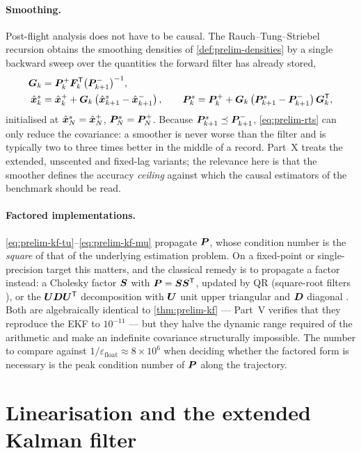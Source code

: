 \paragraph{Smoothing.} Post-flight analysis does not have to be causal. The
Rauch--Tung--Striebel recursion \cite{rauch1965rts} obtains the smoothing densities of
\cref{def:prelim-densities} by a single backward sweep over the quantities the forward filter has
already stored,
\begin{align}
\bm{G}_k &= \bm{P}^{+}_k\bm{F}_k^{\mathsf{T}}\big(\bm{P}^{-}_{k+1}\big)^{-1}, \label{eq:prelim-rtsgain}\\
\hat{\bm{x}}^{s}_k &= \hat{\bm{x}}^{+}_k + \bm{G}_k\left(\hat{\bm{x}}^{s}_{k+1} - \hat{\bm{x}}^{-}_{k+1}\right), \qquad
\bm{P}^{s}_k = \bm{P}^{+}_k + \bm{G}_k\left(\bm{P}^{s}_{k+1} - \bm{P}^{-}_{k+1}\right)\bm{G}_k^{\mathsf{T}},
\label{eq:prelim-rts}
\end{align}
initialised at $\hat{\bm{x}}^s_N = \hat{\bm{x}}^{+}_N$, $\bm{P}^s_N = \bm{P}^{+}_N$. Because
$\bm{P}^{s}_{k+1}\preceq\bm{P}^{-}_{k+1}$, \eqref{eq:prelim-rts} can only reduce the covariance: a
smoother is never worse than the filter and is typically two to three times better in the middle
of a record. Part~X treats the extended, unscented and fixed-lag variants; the relevance here is
that the smoother defines the accuracy \emph{ceiling} against which the causal estimators of the
benchmark should be read.

\paragraph{Factored implementations.} \eqref{eq:prelim-kf-tu}--\eqref{eq:prelim-kf-mu} propagate
$\bm{P}$, whose condition number is the \emph{square} of that of the underlying estimation problem.
On a fixed-point or single-precision target this matters, and the classical remedy is to
propagate a factor instead: a Cholesky factor $\bm{S}$ with $\bm{P} = \bm{S}\bm{S}^{\mathsf{T}}$, updated by QR
(square-root filters \cite{potter1963,kaminski1971}), or the $\bm{U}\bm{D}\bm{U}^{\mathsf{T}}$ decomposition with
$\bm{U}$ unit upper triangular and $\bm{D}$ diagonal \cite{bierman1977,thornton1976ud}. Both are
algebraically identical to \cref{thm:prelim-kf} --- Part~V verifies that they reproduce the EKF
to $10^{-11}$ --- but they halve the dynamic range required of the arithmetic and make an
indefinite covariance structurally impossible. The number to compare against
$1/\varepsilon_{\mathrm{float}} \approx 8\times10^{6}$ when deciding whether the factored form is
necessary is the peak condition number of $\bm{P}$ along the trajectory.

\section{Linearisation and the extended Kalman filter}
\label{sec:prelim-ekf}

